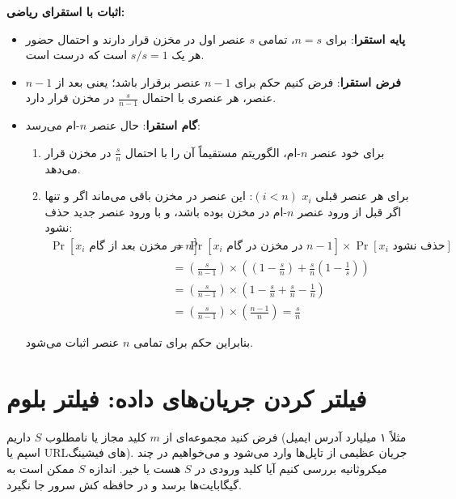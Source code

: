\textbf{اثبات با استقرای ریاضی:}
\begin{itemize}
    \item \textbf{پایه استقرا}: برای $n = s$، تمامی $s$ عنصر اول در مخزن قرار دارند و احتمال حضور هر یک $s/s = 1$ است که درست است.
    \item \textbf{فرض استقرا}: فرض کنیم حکم برای $n-1$ عنصر برقرار باشد؛ یعنی بعد از $n-1$ عنصر، هر عنصری با احتمال $\frac{s}{n-1}$ در مخزن قرار دارد.
    \item \textbf{گام استقرا}: حال عنصر $n$-ام می‌رسد:
    \begin{enumerate}
        \item برای خود عنصر $n$-ام، الگوریتم مستقیماً آن را با احتمال $\frac{s}{n}$ در مخزن قرار می‌دهد.
        \item برای هر عنصر قبلی $x_i$ $(i < n)$: این عنصر در مخزن باقی می‌ماند اگر و تنها اگر قبل از ورود عنصر $n$-ام در مخزن بوده باشد، و با ورود عنصر جدید حذف نشود:
        \begin{align}
        \Pr[x_i \text{ در مخزن بعد از گام } n] &= \Pr[x_i \text{ در مخزن در گام } n-1] \times \Pr[x_i \text{ حذف نشود}] \nonumber \\
        &= \left(\frac{s}{n-1}\right) \times \left( (1 - \frac{s}{n}) + \frac{s}{n} \left(1 - \frac{1}{s}\right) \right) \nonumber \\
        &= \left(\frac{s}{n-1}\right) \times \left( 1 - \frac{s}{n} + \frac{s}{n} - \frac{1}{n} \right) \nonumber \\
        &= \left(\frac{s}{n-1}\right) \times \left( \frac{n-1}{n} \right) = \frac{s}{n}
        \end{align}
    \end{enumerate}
    بنابراین حکم برای تمامی $n$ عنصر اثبات می‌شود.
\end{itemize}

\section{فیلتر کردن جریان‌های داده: فیلتر بلوم \texorpdfstring{}{(Bloom Filter)}}
فرض کنید مجموعه‌ای از $m$ کلید مجاز یا نامطلوب $S$ داریم (مثلاً ۱ میلیارد آدرس ایمیل اسپم یا URLهای فیشینگ). جریان عظیمی از تاپل‌ها وارد می‌شود و می‌خواهیم در چند میکروثانیه بررسی کنیم آیا کلید ورودی در $S$ هست یا خیر. اندازه $S$ ممکن است به گیگابایت‌ها برسد و در حافظه کش سرور جا نگیرد.

